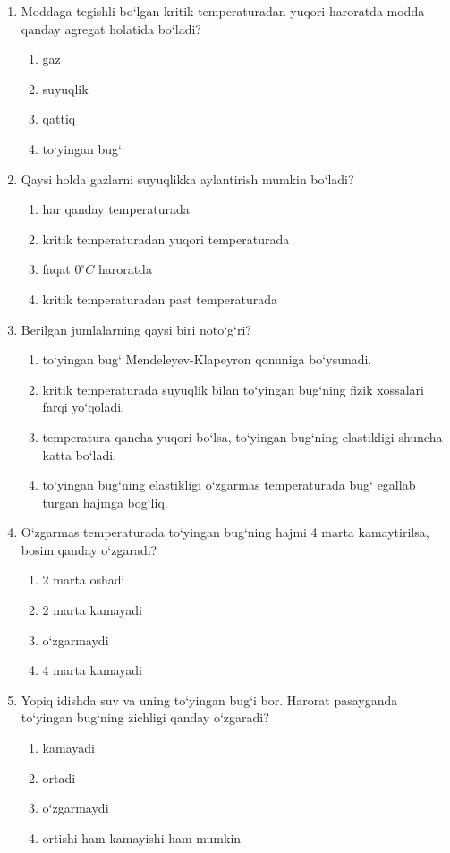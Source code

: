 \begin{enumerate}
\item Moddaga tegishli bo‘lgan kritik temperaturadan yuqori haroratda modda qanday agregat holatida bo‘ladi?
\begin{enumerate}[label=\Alph*)]
\item gaz
\item suyuqlik
\item qattiq
\item to‘yingan bug‘
\end{enumerate}

\item Qaysi holda gazlarni suyuqlikka aylantirish mumkin bo‘ladi?
\begin{enumerate}[label=\Alph*)]
\item har qanday temperaturada
\item kritik temperaturadan yuqori temperaturada
\item faqat $0^\circ C$ haroratda
\item kritik temperaturadan past temperaturada
\end{enumerate}

\item Berilgan jumlalarning qaysi biri noto‘g‘ri?
\begin{enumerate}[label=\Alph*)]
\item to‘yingan bug‘ Mendeleyev-Klapeyron qonuniga bo‘ysunadi.
\item kritik temperaturada suyuqlik bilan to‘yingan bug‘ning fizik xossalari farqi yo‘qoladi.
\item temperatura qancha yuqori bo‘lsa, to‘yingan bug‘ning elastikligi shuncha katta bo‘ladi.
\item to‘yingan bug‘ning elastikligi o‘zgarmas temperaturada bug‘ egallab turgan hajmga bog‘liq.
\end{enumerate}



\item O‘zgarmas temperaturada to‘yingan bug‘ning hajmi 4 marta kamaytirilsa, bosim qanday o‘zgaradi?
\begin{enumerate}[label=\Alph*)]
\item 2 marta oshadi
\item 2 marta kamayadi
\item o‘zgarmaydi
\item 4 marta kamayadi
\end{enumerate}

\item Yopiq idishda suv va uning to‘yingan bug‘i bor. Harorat pasayganda to‘yingan bug‘ning zichligi qanday o‘zgaradi?
\begin{enumerate}[label=\Alph*)]
\item kamayadi
\item ortadi
\item o‘zgarmaydi
\item ortishi ham kamayishi ham mumkin
\end{enumerate}


\end{enumerate}
